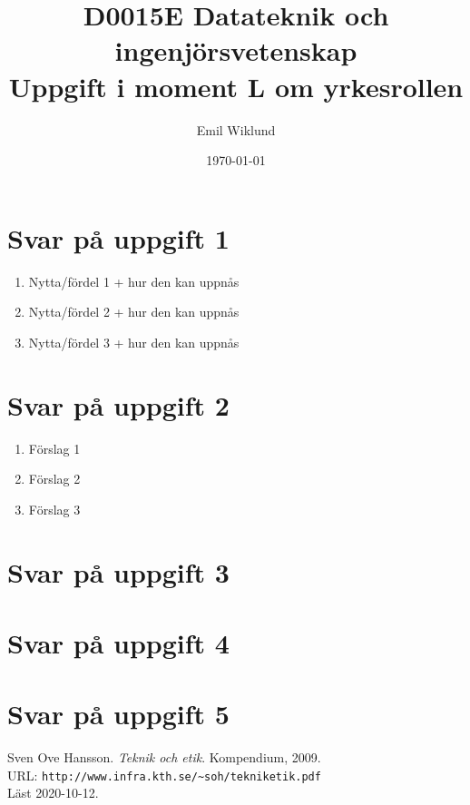 \documentclass[a4paper,12pt]{article}
\title{D0015E Datateknik och ingenjörsvetenskap \\
       Uppgift i moment L om yrkesrollen}
\author{Emil Wiklund}
\date{\today}
\begin{document}
\maketitle




\section*{Svar på uppgift 1}



\begin{enumerate}
  \item Nytta/fördel 1 + hur den kan uppnås
  \item Nytta/fördel 2 + hur den kan uppnås
  \item Nytta/fördel 3 + hur den kan uppnås
\end{enumerate}


\section*{Svar på uppgift 2}



\begin{enumerate}
  \item Förslag 1
  \item Förslag 2
  \item Förslag 3
\end{enumerate}
  
\section*{Svar på uppgift 3}





\section*{Svar på uppgift 4}




\section*{Svar på uppgift 5}




\begin{thebibliography}{99}
   Sven Ove Hansson. \emph{Teknik och etik}.
    Kompendium, 2009. \\
    URL: \verb|http://www.infra.kth.se/~soh/tekniketik.pdf| \\
    Läst 2020-10-12. 
  \end{thebibliography}
\end{document}
